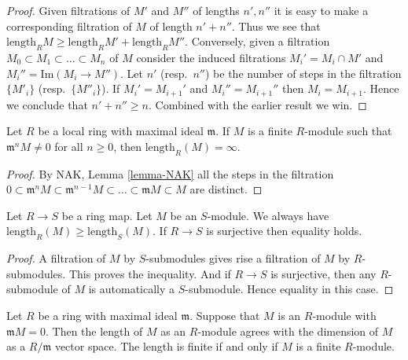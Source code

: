 \begin{proof}
Given filtrations of $M'$ and $M''$ of lengths $n', n''$
it is easy to make a corresponding filtration of $M$
of length $n' + n''$. Thus we see that $\text{length}_R M
\geq \text{length}_R M' + \text{length}_R M''$.
Conversely, given a filtration
$M_0 \subset M_1 \subset \ldots \subset M_n$ of
$M$ consider the induced filtrations
$M_i' = M_i \cap M'$ and $M_i'' = \text{Im}(M_i \to M'')$.
Let $n'$ (resp.\ $n''$) be the number of steps in the filtration
$\{M'_i\}$ (resp.\ $\{M''_i\}$).
If $M_i' = M_{i + 1}'$ and $M_i'' = M_{i + 1}''$ then
$M_i = M_{i + 1}$. Hence we conclude that $n' + n'' \geq n$.
Combined with the earlier result we win.
\end{proof}

\begin{lemma}
\label{lemma-length-infinite}
Let $R$ be a local ring with maximal ideal $\mathfrak m$.
If $M$ is a finite $R$-module such that
$\mathfrak m^n M \not = 0$ for all $n\geq 0$,
then $\text{length}_R(M) = \infty$.
\end{lemma}

\begin{proof}
By NAK, Lemma \ref{lemma-NAK} all the steps in the filtration
$0 \subset \mathfrak m^n M
\subset \mathfrak m^{n-1} M \subset \ldots \subset
\mathfrak m M \subset M$ are distinct.
\end{proof}

\begin{lemma}
\label{lemma-length-independent}
Let $R \to S$ be a ring map. Let $M$ be an $S$-module.
We always have $\text{length}_R(M) \geq \text{length}_S(M)$.
If $R \to S$ is surjective then equality holds.
\end{lemma}

\begin{proof}
A filtration of $M$ by $S$-submodules gives rise a filtration
of $M$ by $R$-submodules. This proves the inequality.
And if $R \to S$ is surjective, then any $R$-submodule
of $M$ is automatically a $S$-submodule. Hence equality
in this case.
\end{proof}

\begin{lemma}
\label{lemma-dimension-is-length}
Let $R$ be a ring with maximal ideal $\mathfrak m$.
Suppose that $M$ is an $R$-module with
$\mathfrak m M  =  0$. Then the length of $M$ as
an $R$-module agrees with the dimension of $M$ as
a $R/\mathfrak m$ vector space.
The length is finite if and only if $M$ is a finite $R$-module.
\end{lemma}

